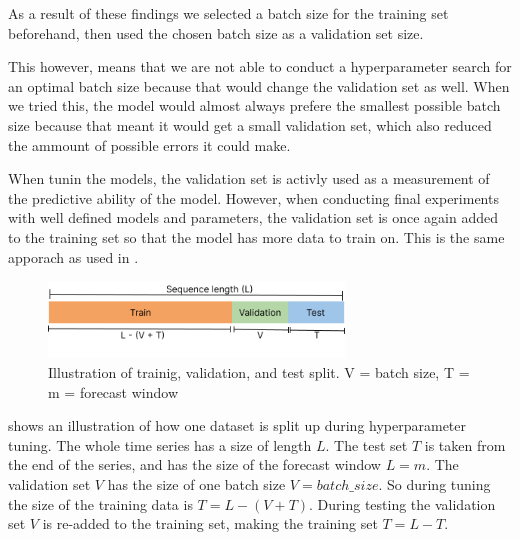 As a result of these findings we selected a batch size for the training set beforehand, then
used the chosen batch size as a validation set size.

This however, means that we are not able to conduct a hyperparameter search for an optimal batch size
because that would change the validation set as well.
When we tried this, the model would almost always prefere the smallest possible batch size because that meant
it would get a small validation set, which also reduced the ammount of possible errors it could make.

When tunin the models, the validation set is activly used as a measurement of the predictive ability of the model.
However, when conducting final experiments with well defined models and parameters,
the validation set is once again added to the training set so that the model has more data to train on.
This is the same apporach as used in \cite{Hewamalage2021}.




\begin{figure}[h!]
  \centering
  \includegraphics[width=0.7\textwidth]{./figs/illustrations/illustration_train_val_test_split.png}
  \hfill
  \caption{Illustration of trainig, validation, and test split. V = batch size, T = m = forecast window}
  \label{fig:train-val-test-split}
\end{figure}

 shows an illustration of how one dataset is split up during
hyperparameter tuning.
The whole time series has a size of length $L$. The test set $T$ is taken from the end of the series,
and has the size of the forecast window $L = m$. The validation set $V$ has the size of
one batch size $V=batch\_size$. So during tuning the size of the training data is
$T = L - (V + T)$. During testing the validation set $V$ is re-added to the training set,
making the training set $T = L - T$.

